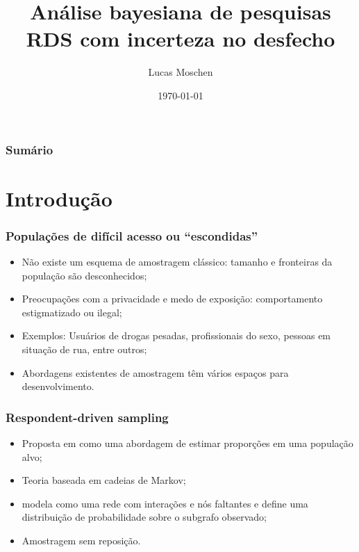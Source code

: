 \documentclass{beamer}
\title[Respondent driven-sampling]
{Análise bayesiana de pesquisas RDS com incerteza no desfecho}
\author[Lucas Moschen]
{Lucas Moschen}
\institute[EMAp/FGV]
{
  Escola de Matemática Aplicada\\
  Fundação Getulio Vargas
}
\date[\today]
{\today}
\newcommand{\Space}{\vspace{3ex}}
\begin{document}
\frame{\titlepage}

\begin{frame}
\frametitle{Sumário}
\tableofcontents
\end{frame}

\section{Introdução}


\begin{frame}
\frametitle{Populações de difícil acesso ou ``escondidas''}

\begin{itemize}
    \justifying
    \item Não existe um esquema de amostragem clássico: tamanho e fronteiras da
    população são desconhecidos;
    \Space
    \item Preocupações com a privacidade e medo de exposição: comportamento
    estigmatizado ou ilegal;
    \Space
    \item Exemplos: Usuários de drogas pesadas, profissionais do sexo, pessoas
    em situação de rua, entre outros;
    \Space 
    \item Abordagens existentes de amostragem têm vários espaços para
    desenvolvimento.
\end{itemize}

\end{frame}

\begin{frame}
\frametitle{Respondent-driven sampling}

  \begin{itemize}
    \justifying
    \item Proposta em \cite{heckathorn1997} como uma abordagem de estimar
    proporções em uma população alvo; 

    \Space

    \item Teoria baseada em cadeias de Markov; 
    
    \Space
    
    \item \cite{crawford2016} modela como uma rede com interações e nós
    faltantes e define uma distribuição de probabilidade sobre o subgrafo
    observado;
    
    \Space 

    \item Amostragem sem reposição. 

  \end{itemize}

\end{frame}
\end{document}
